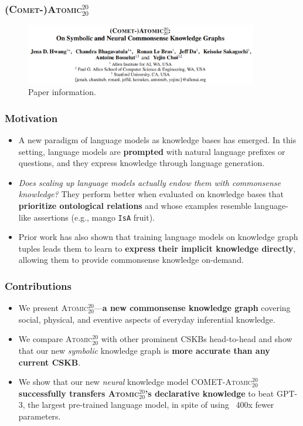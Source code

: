 \documentclass[10pt,aspectratio=43]{beamer}
\newcommand\atomicTT{\textsc{Atomic$^{20}_{20}$}\xspace}
\newcommand\gpttt{\textsc{GPT-3}\xspace}
\newcommand\comet{\textsc{COMET}\xspace}
\newcommand\IsA{\texttt{IsA}}
\begin{document}
	\begin{frame}
	    \frametitle{(\textbf{\textsc{Comet}-)\textsc{Atomic}${^{20}_{20}}$}}
	    \begin{figure}[!t]
	        \centering
	        \includegraphics[width=4in]{figures/comet_info.png}
	        \caption{Paper information. \cite{hwang_comet-_2021} }
	        \label{fig:comet_info}
	    \end{figure}
    \end{frame}
    
    \begin{frame}
        \frametitle{\textbf{Motivation}}
        \begin{itemize}
            \item A new paradigm of language models as knowledge bases has emerged. In this setting, language models are \textbf{prompted} with natural language prefixes or questions, and they express knowledge through language generation.
            \item \textit{Does scaling up language models actually endow them with commonsense knowledge?} They perform better when evaluated on knowledge bases that \textbf{prioritize ontological relations} and whose examples resemble language-like assertions (e.g., mango \IsA{} fruit).
            \item Prior work has also shown that training language models on knowledge graph tuples leads them to learn to \textbf{express their implicit knowledge directly}, allowing them to provide commonsense knowledge on-demand.
        \end{itemize}
    \end{frame}
    
    \begin{frame}
        \frametitle{\textbf{Contributions}}
        \begin{itemize}
            \item We present \atomicTT{}---\textbf{a new commonsense knowledge graph} covering social, physical, and eventive aspects of everyday inferential knowledge.
            \item We compare \atomicTT{} with other prominent CSKBs head-to-head and show that our new \textit{symbolic} knowledge graph is \textbf{more accurate than any current CSKB}.
            \item We show that our new \textit{neural} knowledge model \comet{}-\atomicTT{} \textbf{successfully transfers \atomicTT{}'s declarative knowledge} to beat \gpttt{}, the largest pre-trained language model, in spite of using ~400x fewer parameters.
        \end{itemize}
    \end{frame}
    
\end{document}
